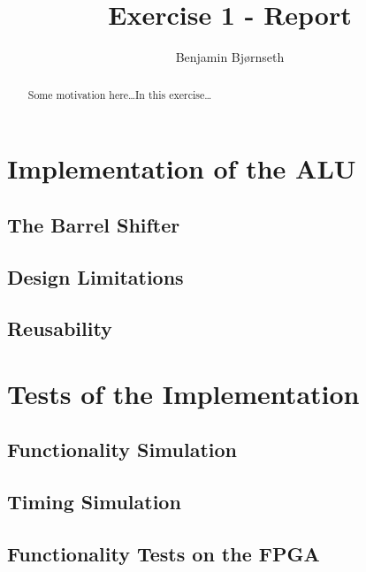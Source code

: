 \documentclass{article}
\title{Exercise 1 - Report}
\author{Benjamin Bj\o rnseth}
\begin{document}
\maketitle
\begin{abstract}
Some motivation here\ldots In this exercise\ldots 
\end{abstract}
\section{Implementation of the ALU}
\label{sec:implementation}

\subsection{The Barrel Shifter}
\label{subsec:barrelshifter}

\subsection{Design Limitations}
\label{subsec:limitations}

\subsection{Reusability}
\label{subsec:reusability}



\section{Tests of the Implementation}
\label{sec:tests}

\subsection{Functionality Simulation}
\label{subsec:funcsim}

\subsection{Timing Simulation}
\label{subsec:timingsim}

\subsection{Functionality Tests on the FPGA}
\label{subsec:funcfpga}
\end{document}
